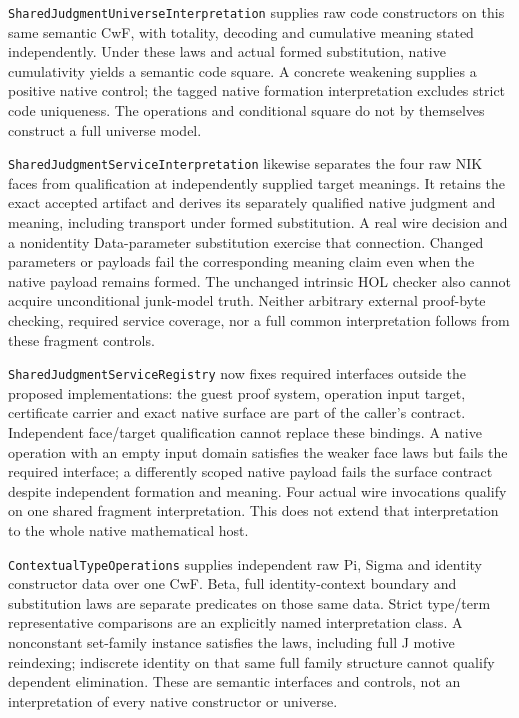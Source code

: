 \documentclass[11pt]{article}
\theoremstyle{definition}
\theoremstyle{remark}
\begin{document}
\nolinkurl{SharedJudgmentUniverseInterpretation} supplies raw code constructors
on this same semantic CwF, with totality, decoding and cumulative meaning
stated independently. Under these laws and actual formed substitution, native
cumulativity yields a semantic code square. A concrete weakening supplies a
positive native control; the tagged native formation interpretation excludes
strict code uniqueness. The operations and conditional square do not by
themselves construct a full universe model.

\nolinkurl{SharedJudgmentServiceInterpretation} likewise separates the four
raw NIK faces from qualification at independently supplied target meanings.
It retains the exact accepted artifact and derives its separately qualified
native judgment and meaning, including transport under formed substitution.
A real wire decision and a nonidentity Data-parameter substitution exercise
that connection. Changed parameters or payloads fail the corresponding
meaning claim even when the native payload remains formed. The unchanged
intrinsic HOL checker also cannot acquire unconditional junk-model truth.
Neither arbitrary external proof-byte checking, required service coverage,
nor a full common interpretation follows from these fragment controls.

\nolinkurl{SharedJudgmentServiceRegistry} now fixes required interfaces outside
the proposed implementations: the guest proof system, operation input target,
certificate carrier and exact native surface are part of the caller's
contract. Independent face/target qualification cannot replace these bindings.
A native operation with an empty input domain satisfies the weaker face laws
but fails the required interface; a differently scoped native payload fails
the surface contract despite independent formation and meaning. Four actual
wire invocations qualify on one shared fragment interpretation. This does not
extend that interpretation to the whole native mathematical host.

\nolinkurl{ContextualTypeOperations} supplies independent raw Pi, Sigma and
identity constructor data over one CwF. Beta, full identity-context boundary
and substitution laws are separate predicates on those same data. Strict
type/term representative comparisons are an explicitly named interpretation
class. A nonconstant set-family instance satisfies the laws, including full
J motive reindexing; indiscrete identity on that same full family structure
cannot qualify dependent elimination. These are semantic interfaces and
controls, not an interpretation of every native constructor or universe.
\end{document}
